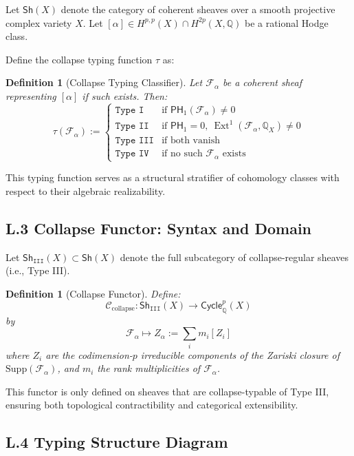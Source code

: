 \documentclass[11pt]{article}
\newtheorem{definition}[theorem]{Definition}
\DeclareMathOperator{\Ext}{Ext}
\begin{document}
Let $\mathsf{Sh}(X)$ denote the category of coherent sheaves over a smooth projective complex variety $X$.  
Let $[\alpha] \in H^{p,p}(X) \cap H^{2p}(X, \mathbb{Q})$ be a rational Hodge class.

Define the collapse typing function $\tau$ as:

\begin{definition}[Collapse Typing Classifier]
Let $\mathcal{F}_\alpha$ be a coherent sheaf representing $[\alpha]$ if such exists. Then:
\[
\tau(\mathcal{F}_\alpha) :=
\begin{cases}
\texttt{Type I} & \text{if } \mathsf{PH}_1(\mathcal{F}_\alpha) \ne 0 \\
\texttt{Type II} & \text{if } \mathsf{PH}_1 = 0,\ \Ext^1(\mathcal{F}_\alpha, \mathbb{Q}_X) \ne 0 \\
\texttt{Type III} & \text{if both vanish} \\
\texttt{Type IV} & \text{if no such } \mathcal{F}_\alpha \text{ exists}
\end{cases}
\]
\end{definition}

This typing function serves as a structural stratifier of cohomology classes with respect to their algebraic realizability.

\subsection*{L.3 Collapse Functor: Syntax and Domain}

Let $\mathsf{Sh}_{\texttt{III}}(X) \subset \mathsf{Sh}(X)$ denote the full subcategory of collapse-regular sheaves (i.e., Type III).

\begin{definition}[Collapse Functor]
Define:
\[
\mathcal{C}_{\text{collapse}}: \mathsf{Sh}_{\texttt{III}}(X) \longrightarrow \mathsf{Cycle}^p_\mathbb{Q}(X)
\]
by
\[
\mathcal{F}_\alpha \mapsto Z_\alpha := \sum_i m_i [Z_i]
\]
where $Z_i$ are the codimension-$p$ irreducible components of the Zariski closure of $\mathrm{Supp}(\mathcal{F}_\alpha)$, and $m_i$ the rank multiplicities of $\mathcal{F}_\alpha$.
\end{definition}

This functor is only defined on sheaves that are collapse-typable of Type III, ensuring both topological contractibility and categorical extensibility.

\subsection*{L.4 Typing Structure Diagram}
\end{document}
